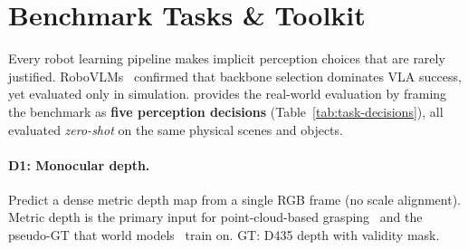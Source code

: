 \section{Benchmark Tasks \& Toolkit}\label{sec:tasks}

Every robot learning pipeline makes implicit perception choices that are rarely justified.
RoboVLMs~\citep{li2025robovlms} confirmed that backbone selection dominates VLA success, yet evaluated only in simulation.
\coolname{} provides the real-world evaluation by framing the benchmark as \textbf{five perception decisions} (Table~\ref{tab:task-decisions}), all evaluated \textit{zero-shot} on the same physical scenes and objects.

\begin{table}[t]
\centering
\caption{Five perception decisions. Each evaluates a signal consumed by deployed robot systems.}
\label{tab:task-decisions}
\end{table}

\paragraph{D1: Monocular depth.}
Predict a dense metric depth map from a single RGB frame (no scale alignment).
Metric depth is the primary input for point-cloud-based grasping~\citep{ze2024dp3} and the pseudo-GT that world models~\citep{zhen2025tesseract} train on.
GT: D435 depth with validity mask.

